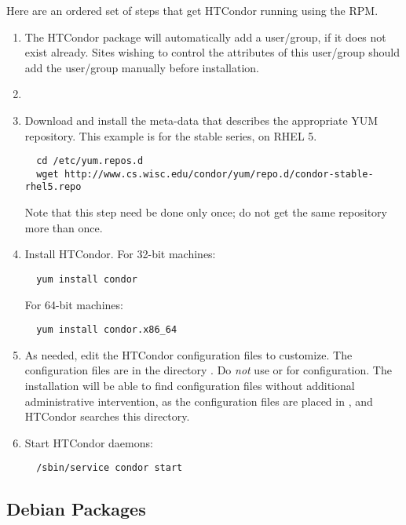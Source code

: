 Here are an ordered set of steps that get HTCondor running using the RPM.
\begin{enumerate}
\item The HTCondor package will automatically add a  user/group,
if it does not exist already.
Sites wishing to control the attributes of this user/group 
should add the  user/group manually before installation.

\item
\item Download and install the meta-data that describes 
the appropriate YUM repository. 
This example is for the stable series, on RHEL 5. 
\footnotesize
\begin{verbatim}
  cd /etc/yum.repos.d
  wget http://www.cs.wisc.edu/condor/yum/repo.d/condor-stable-rhel5.repo
\end{verbatim}
\normalsize
Note that this step need be done only once;
do not get the same repository more than once.

\item Install HTCondor.
For 32-bit machines:
\begin{verbatim}
  yum install condor
\end{verbatim}
For 64-bit machines:
\begin{verbatim}
  yum install condor.x86_64
\end{verbatim}

\item As needed, edit the HTCondor configuration files to customize.
The configuration files are in the directory  .
Do \emph{not} use  or  for configuration.
The installation will be able to find configuration files without
additional administrative intervention,
as the configuration files are placed in ,
and HTCondor searches this directory.

\item Start HTCondor daemons:
\begin{verbatim}
  /sbin/service condor start
\end{verbatim}

\end{enumerate}


\subsection{\label{sec:install-debs} Debian Packages}

